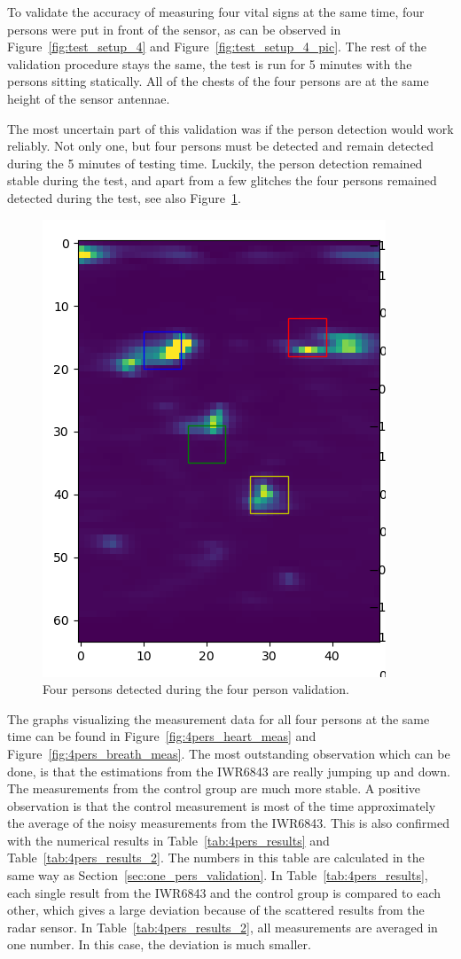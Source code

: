 To validate the accuracy of measuring four vital signs at the same time, four persons were put in front of the sensor, as can be observed in Figure~\ref{fig:test_setup_4} and Figure~\ref{fig:test_setup_4_pic}. The rest of the validation procedure stays the same, the test is run for 5 minutes with the persons sitting statically. All of the chests of the four persons are at the same height of the sensor antennae. 

The most uncertain part of this validation was if the person detection would work reliably. Not only one, but four persons must be detected and remain detected during the 5 minutes of testing time. Luckily, the person detection remained stable during the test, and apart from a few glitches the four persons remained detected during the test, see also Figure~\ref{fig:4_persons_detected}.

\begin{figure}[t]
    \centering
    \includegraphics[width=.4\textwidth]{figures/validation/4personen_testen_crop.png}
    \caption{Four persons detected during the four person validation.}
    \label{fig:4_persons_detected}
\end{figure}

The graphs visualizing the measurement data for all four persons at the same time can be found in Figure~\ref{fig:4pers_heart_meas} and Figure~\ref{fig:4pers_breath_meas}. The most outstanding observation which can be done, is that the estimations from the IWR6843 are really jumping up and down. The measurements from the control group are much more stable. A positive observation is that the control measurement is most of the time approximately the average of the noisy measurements from the IWR6843. This is also confirmed with the numerical results in Table~\ref{tab:4pers_results} and Table~\ref{tab:4pers_results_2}. The numbers in this table are calculated in the same way as Section~\ref{sec:one_pers_validation}. In Table~\ref{tab:4pers_results}, each single result from the IWR6843 and the control group is compared to each other, which gives a large deviation because of the scattered results from the radar sensor. In Table~\ref{tab:4pers_results_2}, all measurements are averaged in one number. In this case, the deviation is much smaller.

